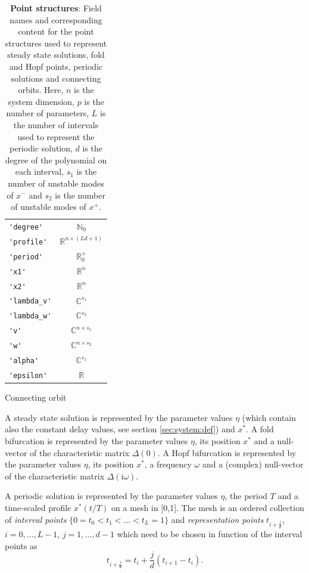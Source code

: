 \documentclass[10pt]{scrartcl}
\newcommand{\define}[1]{\emph{#1}}
\renewcommand{\i}{\mathrm{i}}
\newcommand{\RR}{\mathbb{R}}
\newcommand{\NN}{\mathbb{N}}
\newcommand{\CC}{\mathbb{C}}
\newcommand{\blist}[1]{\mbox{\lstinline!#1!}}
\begin{document}
\begin{table}[htbp]
{\begin{center}
\begin{subtable}[b]{0.45\textwidth}
\begin{tabular}[t]{lc}
        \blist{'degree'}    & $\NN_0$           \\
        \blist{'profile'}   & $\RR^{n\times (Ld+1)}$ \\
        \blist{'period'}    & $\RR^+_0$         \\
        \blist{'x1'}        & $\RR^{n}$ \\
        \blist{'x2'}        & $\RR^{n}$ \\
        \blist{'lambda_v'}  & $\CC^{s_1}$\\
        \blist{'lambda_w'}  & $\CC^{s_2}$\\
        \blist{'v'}         & $\CC^{n\times s_1}$\\
        \blist{'w'}         & $\CC^{n\times s_2}$\\
        \blist{'alpha'}     & $\CC^{s_1}$\\
        \blist{'epsilon'}   & $\RR$\\\hline
      \end{tabular}
      \caption{Connecting orbit}
    \end{subtable}
  \end{center}
}
\caption{\label{point_structures} \textbf{\textsf{Point structures}}:
Field names and corresponding content for the 
point structures used to represent steady state solutions, fold and Hopf 
points, periodic solutions and connecting orbits. Here, $n$ is 
the system dimension, $p$ is the
number of parameters, $L$ is the number of intervals used to represent
the periodic solution, $d$ is the degree of the polynomial on each
interval, $s_1$ is the number of unstable modes of $x^-$ and $s_2$ is the
number of unstable modes of $x^+$.}
\end{table}

A steady state solution is represented by the parameter values
$\eta$ (which contain also the constant delay values, 
see section \ref{sec:system:def})
and $x^*$. A fold bifurcation is represented by the parameter
values $\eta$, its position $x^*$ and a null-vector of the
characteristic matrix $\Delta(0)$. A Hopf bifurcation is represented 
by the parameter
values $\eta$, its position $x^*$, a frequency $\omega$
and a (complex) null-vector of the
characteristic matrix $\Delta(\i \omega)$.

A periodic solution is represented by the parameter
values $\eta$, the period $T$ and 
a time-scaled profile $x^*(t/T)$ on a mesh in [0,1].
The mesh is an ordered 
collection of \define{interval points} $\{0=t_0<t_1<\ldots<t_L=1\}$
and \define{representation points} $t_{i+\frac{j}{d}}$, $i=0,\ldots,L-1$,
$j=1,\ldots,d-1$ which need to be chosen in function of the interval points as
\[
t_{i+\frac{j}{d}}=t_i+\frac{j}{d}(t_{i+1}-t_i).
\]
\end{document}

